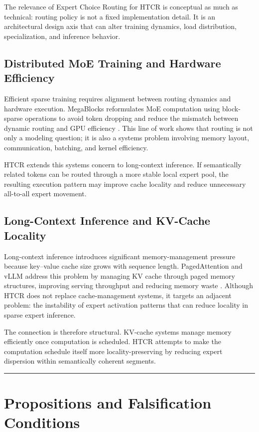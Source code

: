The relevance of Expert Choice Routing for HTCR is conceptual as much as technical: routing policy is not a fixed implementation detail. It is an architectural design axis that can alter training dynamics, load distribution, specialization, and inference behavior.

\section{Distributed MoE Training and Hardware Efficiency}

Efficient sparse training requires alignment between routing dynamics and hardware execution. MegaBlocks reformulates MoE computation using block-sparse operations to avoid token dropping and reduce the mismatch between dynamic routing and GPU efficiency \cite{Gale2023}. This line of work shows that routing is not only a modeling question; it is also a systems problem involving memory layout, communication, batching, and kernel efficiency.

HTCR extends this systems concern to long-context inference. If semantically related tokens can be routed through a more stable local expert pool, the resulting execution pattern may improve cache locality and reduce unnecessary all-to-all expert movement.

\section{Long-Context Inference and KV-Cache Locality}

Long-context inference introduces significant memory-management pressure because key--value cache size grows with sequence length. PagedAttention and vLLM address this problem by managing KV cache through paged memory structures, improving serving throughput and reducing memory waste \cite{Kwon2023}. Although HTCR does not replace cache-management systems, it targets an adjacent problem: the instability of expert activation patterns that can reduce locality in sparse expert inference.

The connection is therefore structural. KV-cache systems manage memory efficiently once computation is scheduled. HTCR attempts to make the computation schedule itself more locality-preserving by reducing expert dispersion within semantically coherent segments.

\vspace{2em}
\hrule
\vspace{2em}

\chapter{Propositions and Falsification Conditions}

